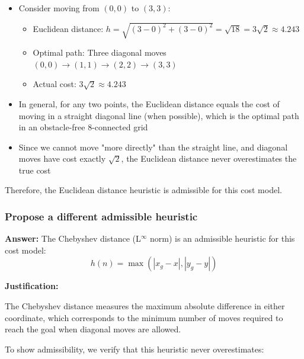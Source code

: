 \documentclass[11pt]{article}
\begin{document}
\begin{itemize}
    \item Consider moving from $(0,0)$ to $(3,3)$:
    \begin{itemize}
        \item Euclidean distance: $h = \sqrt{(3-0)^2 + (3-0)^2} = \sqrt{18} = 3\sqrt{2} \approx 4.243$
        \item Optimal path: Three diagonal moves $(0,0) \rightarrow (1,1) \rightarrow (2,2) \rightarrow (3,3)$
        \item Actual cost: $3\sqrt{2} \approx 4.243$
    \end{itemize}
    \item In general, for any two points, the Euclidean distance equals the cost of moving in a straight diagonal line (when possible), which is the optimal path in an obstacle-free 8-connected grid
    \item Since we cannot move "more directly" than the straight line, and diagonal moves have cost exactly $\sqrt{2}$, the Euclidean distance never overestimates the true cost
\end{itemize}

Therefore, the Euclidean distance heuristic is admissible for this cost model.

\subsubsection*{Propose a different admissible heuristic}

\textbf{Answer:} The Chebyshev distance (L$^\infty$ norm) is an admissible heuristic for this cost model:
$$h(n) = \max(|x_g - x|, |y_g - y|)$$

\textbf{Justification:}

The Chebyshev distance measures the maximum absolute difference in either coordinate, which corresponds to the minimum number of moves required to reach the goal when diagonal moves are allowed.

To show admissibility, we verify that this heuristic never overestimates:
\end{document}
